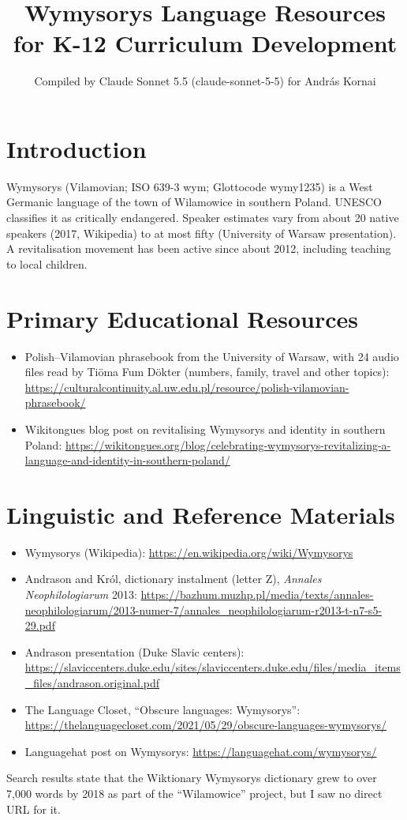 \documentclass[12pt]{article}
\title{Wymysorys Language Resources for K-12 Curriculum Development}
\author{Compiled by Claude Sonnet 5.5 (claude-sonnet-5-5) for Andr\'as Kornai}
\date{}
\begin{document}
\maketitle

\section{Introduction}
Wymysorys (Vilamovian; ISO 639-3 wym; Glottocode wymy1235) is a West Germanic language of the town of Wilamowice in southern Poland. UNESCO classifies it as critically endangered. Speaker estimates vary from about 20 native speakers (2017, Wikipedia) to at most fifty (University of Warsaw presentation). A revitalisation movement has been active since about 2012, including teaching to local children.

\section{Primary Educational Resources}
\begin{itemize}
\item Polish--Vilamovian phrasebook from the University of Warsaw, with 24 audio files read by Ti\"oma Fum D\"okter (numbers, family, travel and other topics): \url{https://culturalcontinuity.al.uw.edu.pl/resource/polish-vilamovian-phrasebook/}
\item Wikitongues blog post on revitalising Wymysorys and identity in southern Poland: \url{https://wikitongues.org/blog/celebrating-wymysorys-revitalizing-a-language-and-identity-in-southern-poland/}
\end{itemize}

\section{Linguistic and Reference Materials}
\begin{itemize}
\item Wymysorys (Wikipedia): \url{https://en.wikipedia.org/wiki/Wymysorys}
\item Andrason and Kr\'ol, dictionary instalment (letter Z), \emph{Annales Neophilologiarum} 2013: \url{https://bazhum.muzhp.pl/media/texts/annales-neophilologiarum/2013-numer-7/annales_neophilologiarum-r2013-t-n7-s5-29.pdf}
\item Andrason presentation (Duke Slavic centers): \url{https://slaviccenters.duke.edu/sites/slaviccenters.duke.edu/files/media_items_files/andrason.original.pdf}
\item The Language Closet, ``Obscure languages: Wymysorys'': \url{https://thelanguagecloset.com/2021/05/29/obscure-languages-wymysorys/}
\item Languagehat post on Wymysorys: \url{https://languagehat.com/wymysorys/}
\end{itemize}
Search results state that the Wiktionary Wymysorys dictionary grew to over 7,000 words by 2018 as part of the ``Wilamowice'' project, but I saw no direct URL for it.
\end{document}
